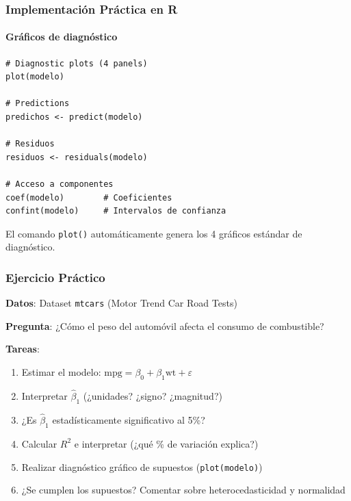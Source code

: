 \documentclass[aspectratio=169,11pt]{beamer}
\begin{document}
\begin{frame}[fragile]
\frametitle{Implementación Práctica en R}
\framesubtitle{Gráficos de diagnóstico}

\begin{lstlisting}
# Diagnostic plots (4 panels)
plot(modelo)

# Predictions
predichos <- predict(modelo)

# Residuos
residuos <- residuals(modelo)

# Acceso a componentes
coef(modelo)        # Coeficientes
confint(modelo)     # Intervalos de confianza
\end{lstlisting}

\small
\vspace{0.3cm}
El comando \texttt{plot()} automáticamente genera los 4 gráficos estándar de diagnóstico.
\end{frame}

\begin{frame}
\frametitle{Ejercicio Práctico}

\small
\textbf{Datos}: Dataset \texttt{mtcars} (Motor Trend Car Road Tests)

\vspace{0.3cm}
\textbf{Pregunta}: ¿Cómo el peso del automóvil afecta el consumo de combustible?

\vspace{0.3cm}
\textbf{Tareas}:
\setlength{\itemsep}{3pt}
\begin{enumerate}
    \item Estimar el modelo: $\text{mpg} = \beta_0 + \beta_1 \text{wt} + \varepsilon$

    \item Interpretar $\hat{\beta}_1$ (¿unidades? ¿signo? ¿magnitud?)

    \item ¿Es $\hat{\beta}_1$ estadísticamente significativo al 5\%?

    \item Calcular $R^2$ e interpretar (¿qué \% de variación explica?)

    \item Realizar diagnóstico gráfico de supuestos (\texttt{plot(modelo)})

    \item ¿Se cumplen los supuestos? Comentar sobre heterocedasticidad y normalidad
\end{enumerate}
\end{frame}
\end{document}
